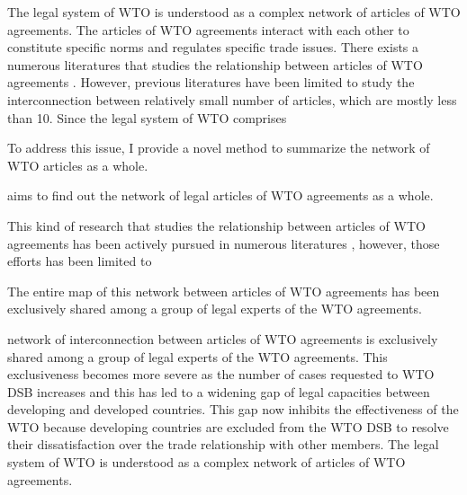 

The legal system of WTO is understood as a complex network of articles of WTO agreements.
The articles of WTO agreements interact with each other to constitute specific norms and regulates specific trade issues.
There exists a numerous literatures that studies the relationship between articles of WTO agreements \citep{chadXXIII, charnovitz, Trachtman, who_gets}.
However, previous literatures have been limited to study the interconnection between relatively small number of articles, which are mostly less than 10. %
Since the legal system of WTO comprises 


To address this issue, I provide a novel method to summarize the network of WTO articles as a whole.




aims to find out the network of legal articles of WTO agreements as a whole.

This kind of research that studies the relationship between articles of WTO agreements has been actively pursued in numerous literatures \citep{chadXXIII, charnovitz, Trachtman, who_gets}, however, those efforts has been limited to


The entire map of this network between articles of WTO agreements has been exclusively shared among a group of legal experts of the WTO agreements.



network of interconnection between articles of WTO agreements is exclusively shared among a group of legal experts of the WTO agreements. 
This exclusiveness becomes more severe as the number of cases requested to WTO DSB increases and this has led to a widening gap of legal capacities between developing and developed countries.
This gap now inhibits the effectiveness of the WTO because developing countries are excluded from the WTO DSB to resolve their dissatisfaction over the trade relationship with other members.
The legal system of WTO is understood as a complex network of articles of WTO agreements.




